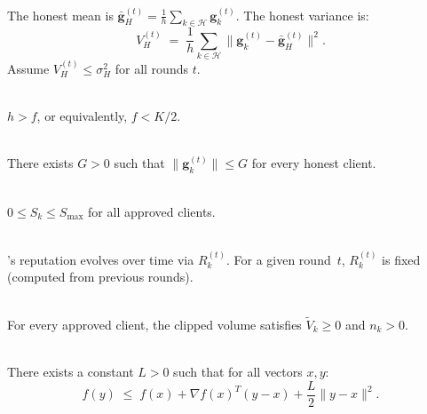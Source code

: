 \documentclass[../main]{subfiles}
\begin{document}
\begin{assumption}
\hfill \\\label{asm:A3}
The honest mean is $\bar{\mathbf{g}}_H^{(t)} = \frac{1}{h}\sum_{k\in\mathcal{H}} \mathbf{g}_k^{(t)}$.
The honest variance is:
\[
    V_H^{(t)} \;=\; \frac{1}{h} \sum_{k \in \mathcal{H}} \|\mathbf{g}_k^{(t)} - \bar{\mathbf{g}}_H^{(t)}\|^2.
\]
Assume $V_H^{(t)} \leq \sigma_H^2$ for all rounds $t$.
\end{assumption}

\begin{assumption}
\hfill \\\label{asm:A4}
$h > f$, or equivalently, $f < K/2$.
\end{assumption}

\begin{assumption}
\hfill \\\label{asm:A5}
There exists $G > 0$ such that $\|\mathbf{g}_k^{(t)}\| \leq G$ for every honest client.
\end{assumption}

\begin{assumption}
\hfill \\\label{asm:A6}
$0 \leq S_k \leq S_{\max}$ for all approved clients.
\end{assumption}

\begin{assumption}
\hfill \\\label{asm:A7}
\aegis{}'s reputation evolves over time via $R_k^{(t)}$. For a given
round~$t$, $R_k^{(t)}$ is fixed (computed from previous rounds).
\end{assumption}

\begin{assumption}
\hfill \\\label{asm:A8}
For every approved client, the clipped volume satisfies
$\widetilde{V}_k \geq 0$ and $n_k > 0$.
\end{assumption}

\begin{assumption}
\hfill \\\label{asm:A9}
There exists a constant $L > 0$ such that for all vectors $x, y$:
\[
    f(y) \;\leq\; f(x) + \nabla f(x)^T(y - x) + \frac{L}{2}\|y - x\|^2.
\]
\end{assumption}
\end{document}

